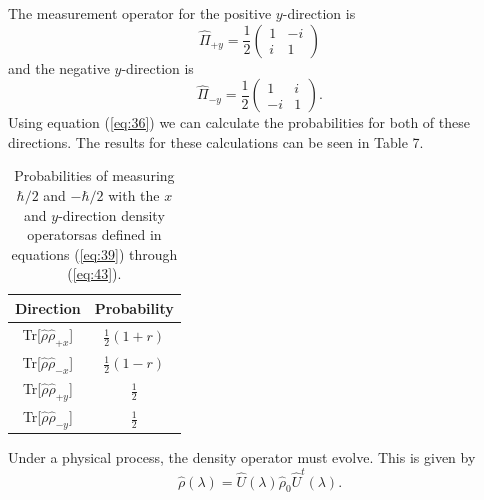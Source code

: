 \documentclass[twocolumn]{article}
\begin{document}
The measurement operator for the positive $y$-direction is
\begin{equation} \label{eq:42}
\hat{\Pi}_{+y}=\frac{1}{2}
\begin{pmatrix}
1 & -i \\
i & 1
\end{pmatrix}
\end{equation}
and the negative $y$-direction is
\begin{equation} \label{eq:43}
\hat{\Pi}_{-y}=\frac{1}{2}
\begin{pmatrix}
1 & i \\
-i & 1
\end{pmatrix}.
\end{equation}
Using equation (\ref{eq:36}) we can calculate the probabilities for both of these directions. The results for these calculations can be seen in Table 7.
\begin{table}[h!]
\begin{center}
\begin{tabular}{ |c|c| }
\hline Direction & Probability \\
\hline Tr[$\hat{\rho}\hat{\rho}_{+x}$] & $\frac{1}{2}(1+r)$ \\
\hline Tr[$\hat{\rho}\hat{\rho}_{-x}$] & $\frac{1}{2}(1-r)$ \\
\hline Tr[$\hat{\rho}\hat{\rho}_{+y}$] & $\frac{1}{2}$ \\
\hline Tr[$\hat{\rho}\hat{\rho}_{-y}$] & $\frac{1}{2}$ \\
\hline
\end{tabular} 
\caption{Probabilities of measuring $\hbar/2$ and $-\hbar/2$ with the $x$ and $y$-direction density operatorsas defined in equations (\ref{eq:39}) through (\ref{eq:43}).}
\end{center}
\end{table}
\newline 
Under a physical process, the density operator must evolve. This is given by
\begin{equation} \label{eq:44}
\hat{\rho}(\lambda)=\hat{U}(\lambda)\hat{\rho}_0\hat{U}^{t}(\lambda).
\end{equation}
\end{document}
